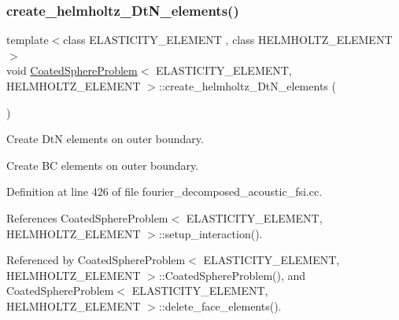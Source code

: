 \subsubsection{\texorpdfstring{create\+\_\+helmholtz\+\_\+\+Dt\+N\+\_\+elements()}{create\_helmholtz\_DtN\_elements()}\hspace{0.1cm}{\footnotesize\ttfamily [1/2]}}
{\footnotesize\ttfamily template$<$class E\+L\+A\+S\+T\+I\+C\+I\+T\+Y\+\_\+\+E\+L\+E\+M\+E\+NT , class H\+E\+L\+M\+H\+O\+L\+T\+Z\+\_\+\+E\+L\+E\+M\+E\+NT $>$ \\
void \hyperlink{classCoatedSphereProblem}{Coated\+Sphere\+Problem}$<$ E\+L\+A\+S\+T\+I\+C\+I\+T\+Y\+\_\+\+E\+L\+E\+M\+E\+NT, H\+E\+L\+M\+H\+O\+L\+T\+Z\+\_\+\+E\+L\+E\+M\+E\+NT $>$\+::create\+\_\+helmholtz\+\_\+\+Dt\+N\+\_\+elements (\begin{DoxyParamCaption}{ }\end{DoxyParamCaption})\hspace{0.3cm}{\ttfamily [private]}}



Create DtN elements on outer boundary. 

Create BC elements on outer boundary. 

Definition at line 426 of file fourier\+\_\+decomposed\+\_\+acoustic\+\_\+fsi.\+cc.



References Coated\+Sphere\+Problem$<$ E\+L\+A\+S\+T\+I\+C\+I\+T\+Y\+\_\+\+E\+L\+E\+M\+E\+N\+T, H\+E\+L\+M\+H\+O\+L\+T\+Z\+\_\+\+E\+L\+E\+M\+E\+N\+T $>$\+::setup\+\_\+interaction().



Referenced by Coated\+Sphere\+Problem$<$ E\+L\+A\+S\+T\+I\+C\+I\+T\+Y\+\_\+\+E\+L\+E\+M\+E\+N\+T, H\+E\+L\+M\+H\+O\+L\+T\+Z\+\_\+\+E\+L\+E\+M\+E\+N\+T $>$\+::\+Coated\+Sphere\+Problem(), and Coated\+Sphere\+Problem$<$ E\+L\+A\+S\+T\+I\+C\+I\+T\+Y\+\_\+\+E\+L\+E\+M\+E\+N\+T, H\+E\+L\+M\+H\+O\+L\+T\+Z\+\_\+\+E\+L\+E\+M\+E\+N\+T $>$\+::delete\+\_\+face\+\_\+elements().

\mbox{\label{classCoatedSphereProblem_a867f4ed706f00a73c87c2c862dcf19c3}} 

